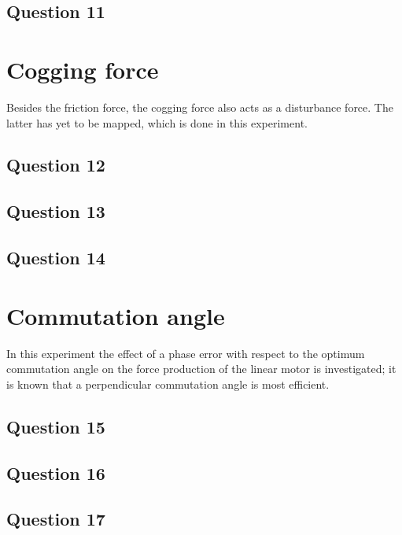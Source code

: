 \documentclass{scrartcl}
\newcommand\tab[1][0.5cm]{\hspace*{#1}}
\begin{document}
    \subsection{Question 11}
    \label{5c}
    
    
\section{Cogging force}
\tab Besides the friction force, the cogging force also acts as a disturbance force. The latter has yet to be mapped, which is done in this experiment.

	\subsection{Question 12}
    \label{6a}
    
    
	\subsection{Question 13}
    \label{6b}
    
    
	\subsection{Question 14}
    \label{6c}
    
    
\section{Commutation angle}
\tab In this experiment the effect of a phase error with respect to the optimum commutation angle on the force production of the linear motor is investigated; it is known that a perpendicular commutation angle is most efficient.

	\subsection{Question 15}
    \label{7a}
    
    
    \subsection{Question 16}
    \label{7b}
    
    
    \subsection{Question 17}
    \label{7c}
    
    
\end{document}

